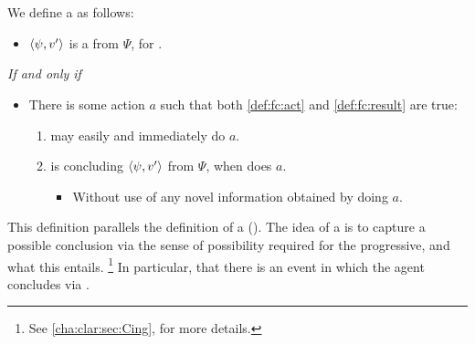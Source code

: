 \section{}
\label{cha:fcs:def}

\begin{note}[\fc{2} definition]
  We define a \emph{} as follows:

  \begin{definition}[\fc{3}]
    \label{def:fc}

    \begin{itemize}
    \item
      \(\langle \psi, v' \rangle\) is a \emph{} from \(\Psi\), for \vAgent{}.
    \end{itemize}

    \emph{If and only if}

    \begin{itemize}
    \item
      There is some action \(a\) such that both \ref{def:fc:act} and \ref{def:fc:result} are true:
      \begin{enumerate}[label=\alph*., ref=(\alph*), series=fcCounter]
      \item
        \label{def:fc:act}
        \vAgent{} may easily and immediately do \(a\).
      \item
        \label{def:fc:result}
        \vAgent{} is concluding \(\langle \psi, v' \rangle\) from \(\Psi\), when \vAgent{} does \(a\).
        \begin{itemize}
        \item
          Without use of any novel information obtained by doing \(a\).
        \end{itemize}
      \end{enumerate}
    \end{itemize}
    \vspace{-\baselineskip}
  \end{definition}

  This definition parallels the definition of a \pevent{} ().
  The idea of a \fc{} is to capture a possible conclusion via the sense of possibility required for the progressive, and what this entails.%
  \footnote{
    See \autoref{cha:clar:sec:Cing},  for more details.
  }
  In particular, that there is an event in which the agent concludes via \assuPP{}.


\end{note}
